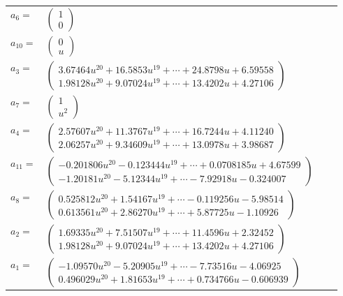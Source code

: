 \documentclass[1p]{elsarticle_modified}
\theoremstyle{definition}
\begin{document}
\begin{tabular}{m{7pt} m{180pt} m{7pt} m{180pt} }
\flushright $a_{6}=$&$\begin{pmatrix}1\\0\end{pmatrix}$ \\
\flushright $a_{10}=$&$\begin{pmatrix}0\\u\end{pmatrix}$ \\
\flushright $a_{3}=$&$\begin{pmatrix}3.67464 u^{20}+16.5853 u^{19}+\cdots+24.8798 u+6.59558\\1.98128 u^{20}+9.07024 u^{19}+\cdots+13.4202 u+4.27106\end{pmatrix}$ \\
\flushright $a_{7}=$&$\begin{pmatrix}1\\u^2\end{pmatrix}$ \\
\flushright $a_{4}=$&$\begin{pmatrix}2.57607 u^{20}+11.3767 u^{19}+\cdots+16.7244 u+4.11240\\2.06257 u^{20}+9.34609 u^{19}+\cdots+13.0978 u+3.98687\end{pmatrix}$ \\
\flushright $a_{11}=$&$\begin{pmatrix}-0.201806 u^{20}-0.123444 u^{19}+\cdots+0.0708185 u+4.67599\\-1.20181 u^{20}-5.12344 u^{19}+\cdots-7.92918 u-0.324007\end{pmatrix}$ \\
\flushright $a_{8}=$&$\begin{pmatrix}0.525812 u^{20}+1.54167 u^{19}+\cdots-0.119256 u-5.98514\\0.613561 u^{20}+2.86270 u^{19}+\cdots+5.87725 u-1.10926\end{pmatrix}$ \\
\flushright $a_{2}=$&$\begin{pmatrix}1.69335 u^{20}+7.51507 u^{19}+\cdots+11.4596 u+2.32452\\1.98128 u^{20}+9.07024 u^{19}+\cdots+13.4202 u+4.27106\end{pmatrix}$ \\
\flushright $a_{1}=$&$\begin{pmatrix}-1.09570 u^{20}-5.20905 u^{19}+\cdots-7.73516 u-4.06925\\0.496029 u^{20}+1.81653 u^{19}+\cdots+0.734766 u-0.606939\end{pmatrix}$ \\

\end{tabular}
\end{document}
